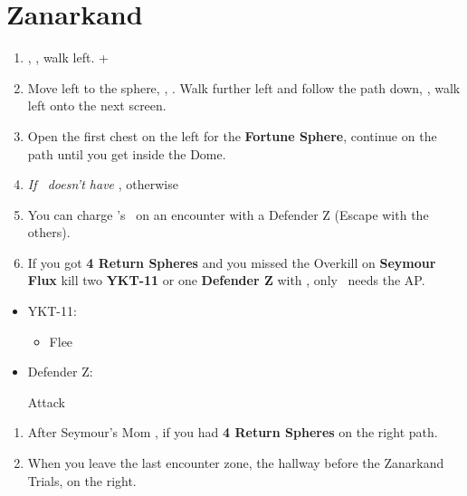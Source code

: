 \chapter{Zanarkand}
\begin{enumerate}
    \item \sd, \cs[0:50], walk left. \fmv+\cs[2:20]
    \item Move left to the sphere, \sd, \cs[1:40]. Walk further left and follow the path down, \cs[3:20], walk left onto the next screen.
    \item Open the first chest on the left for the \textbf{Fortune Sphere}, continue on the path until you get inside the Dome.
    \item \textit{If \rikku\ doesn't have \od} \formation{\tidus}{\auron}{\rikku}, otherwise \formation{\tidus}{\auron}{\kimahri}
    \item You can charge \rikku's \od\ on an encounter with a Defender Z (Escape with the others).
    \item If you got \textbf{4 Return Spheres} and you missed the Overkill on \textbf{Seymour Flux} kill two \textbf{YKT-11} or one \textbf{Defender Z} with \formation{\tidus}{\auron}{\yuna}, only \yuna\ needs the AP.
\end{enumerate}
\begin{encounters}
    \begin{itemize}
        \item YKT-11:
        \begin{itemize}
            \yunaf Attack
            \tidusf Attack
            \item Flee
        \end{itemize}
        \item Defender Z:
        \begin{itemize}
            \summon{\bahamut}
            \bahamutf Attack
        \end{itemize}
    \end{itemize}
\end{encounters}
\begin{enumerate}[resume]
    \item After Seymour's Mom \cs, if you had \textbf{4 Return Spheres}  on the right path.
    \item When you leave the last encounter zone, the hallway before the Zanarkand Trials,  on the right.
\end{enumerate}
